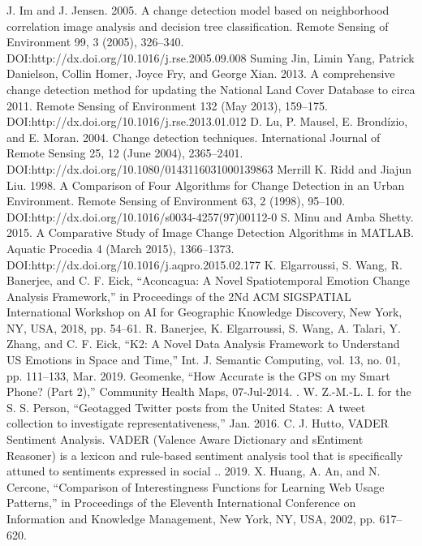 \documentclass[conference]{IEEEtran}
\begin{document}
\newpage
\begin{thebibliography}{12}

  
 J. Im and J. Jensen. 2005. A change detection model based on neighborhood correlation image analysis and decision tree classification. Remote Sensing of Environment 99, 3 (2005), 326–340. DOI:http://dx.doi.org/10.1016/j.rse.2005.09.008 
 Suming Jin, Limin Yang, Patrick Danielson, Collin Homer, Joyce Fry, and George Xian. 2013. A comprehensive change detection method for updating the National Land Cover Database to circa 2011. Remote Sensing of Environment 132 (May 2013), 159–175. DOI:http://dx.doi.org/10.1016/j.rse.2013.01.012 
 D. Lu, P. Mausel, E. Brondízio, and E. Moran. 2004. Change detection techniques. International Journal of Remote Sensing 25, 12 (June 2004), 2365–2401. DOI:http://dx.doi.org/10.1080/0143116031000139863 
 Merrill K. Ridd and Jiajun Liu. 1998. A Comparison of Four Algorithms for Change Detection in an Urban Environment. Remote Sensing of Environment 63, 2 (1998), 95–100. DOI:http://dx.doi.org/10.1016/s0034-4257(97)00112-0 
 S. Minu and Amba Shetty. 2015. A Comparative Study of Image Change Detection Algorithms in MATLAB. Aquatic Procedia 4 (March 2015), 1366–1373. DOI:http://dx.doi.org/10.1016/j.aqpro.2015.02.177 
 K. Elgarroussi, S. Wang, R. Banerjee, and C. F. Eick, “Aconcagua: A Novel Spatiotemporal Emotion Change Analysis Framework,” in Proceedings of the 2Nd ACM SIGSPATIAL International Workshop on AI for Geographic Knowledge Discovery, New York, NY, USA, 2018, pp. 54–61.
 R. Banerjee, K. Elgarroussi, S. Wang, A. Talari, Y. Zhang, and C. F. Eick, “K2: A Novel Data Analysis Framework to Understand US Emotions in Space and Time,” Int. J. Semantic Computing, vol. 13, no. 01, pp. 111–133, Mar. 2019.
 Geomenke, “How Accurate is the GPS on my Smart Phone? (Part 2),” Community Health Maps, 07-Jul-2014. .
 W. Z.-M.-L. I. for the S. S. Person, “Geotagged Twitter posts from the United States: A tweet collection to investigate representativeness,” Jan. 2016.
 C. J. Hutto, VADER Sentiment Analysis. VADER (Valence Aware Dictionary and sEntiment Reasoner) is a lexicon and rule-based sentiment analysis tool that is specifically attuned to sentiments expressed in social .. 2019.
 X. Huang, A. An, and N. Cercone, “Comparison of Interestingness Functions for Learning Web Usage Patterns,” in Proceedings of the Eleventh International Conference on Information and Knowledge Management, New York, NY, USA, 2002, pp. 617–620.

\end{thebibliography}
\end{document}
